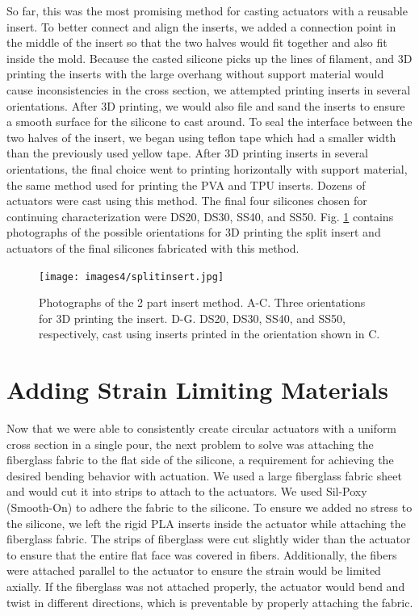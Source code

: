 So far, this was the most promising method for casting actuators with a reusable insert. To better connect and align the inserts, we added a connection point in the middle of the insert so that the two halves would fit together and also fit inside the mold. Because the casted silicone picks up the lines of filament, and 3D printing the inserts with the large overhang without support material would cause inconsistencies in the cross section, we attempted printing inserts in several orientations. After 3D printing, we would also file and sand the inserts to ensure a smooth surface for the silicone to cast around. To seal the interface between the two halves of the insert, we began using teflon tape which had a smaller width than the previously used yellow tape. After 3D printing inserts in several orientations, the final choice went to printing horizontally with support material, the same method used for printing the PVA and TPU inserts. Dozens of actuators were cast using this method. The final four silicones chosen for continuing characterization were DS20, DS30, SS40, and SS50. Fig. \ref{fig:splitinsert} contains photographs of the possible orientations for 3D printing the split insert and actuators of the final silicones fabricated with this method. 

\begin{figure}[h!]
    \centering
    \texttt{[image: images4/splitinsert.jpg]}
    \caption{Photographs of the 2 part insert method. A-C. Three orientations for 3D printing the insert. D-G. DS20, DS30, SS40, and SS50, respectively, cast using inserts printed in the orientation shown in C.}
    \label{fig:splitinsert}
\end{figure}

\section{Adding Strain Limiting Materials}
Now that we were able to consistently create circular actuators with a uniform cross section in a single pour, the next problem to solve was attaching the fiberglass fabric to the flat side of the silicone, a requirement for achieving the desired bending behavior with actuation. We used a large fiberglass fabric sheet and would cut it into strips to attach to the actuators. We used Sil-Poxy (Smooth-On) to adhere the fabric to the silicone. To ensure we added no stress to the silicone, we left the rigid PLA inserts inside the actuator while attaching the fiberglass fabric. The strips of fiberglass were cut slightly wider than the actuator to ensure that the entire flat face was covered in fibers. Additionally, the fibers were attached parallel to the actuator to ensure the strain would be limited axially. If the fiberglass was not attached properly, the actuator would bend and twist in different directions, which is preventable by properly attaching the fabric. 

